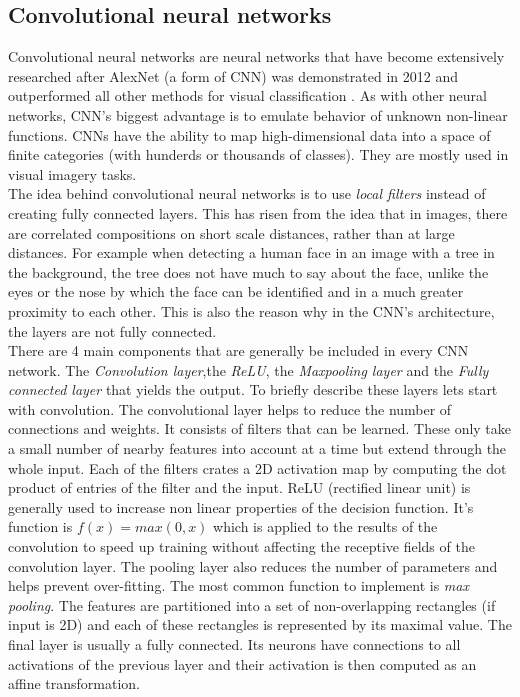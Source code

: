 \subsection{Convolutional neural networks}
Convolutional neural networks are neural networks that have become extensively researched after AlexNet (a form of CNN) was demonstrated in 2012 and outperformed all other methods for visual classification \cite{Krizhevsky:2012:ICD:2999134.2999257}. As with other neural networks, CNN's biggest advantage is to emulate behavior of unknown non-linear functions. CNNs have the ability to map high-dimensional data into a space of finite categories (with hunderds or thousands of classes). They are mostly used in visual imagery tasks. \\
The idea behind convolutional neural networks is to use \textit{local filters} instead of creating fully connected layers. This has risen from the idea that in images, there are correlated compositions on short scale distances, rather than at large distances. For example when detecting a human face in an image with a tree in the background, the tree does not have much to say about the face, unlike the eyes or the nose by which the face can be identified and in a much greater proximity to each other. This is also the reason why in the CNN's architecture, the layers are not fully connected. \\
There are 4 main components that are generally be included in every CNN network. The \textit{Convolution layer},the \textit{ReLU}, the \textit{Maxpooling layer} and the \textit{Fully connected layer} that yields the output. To briefly describe these layers lets start with convolution. The convolutional layer helps to reduce the number of connections and weights. It consists of filters that can be learned. These only take a small number of nearby features into account at a time but extend through the whole input. Each of the filters crates a 2D activation map by computing the dot product of entries of the filter and the input. ReLU (rectified linear unit) is generally used to increase non linear properties of the decision function. It's function is $ f(x) = max(0,x) $ which is applied to the results of the convolution to speed up training without affecting the receptive fields of the convolution layer. The pooling layer also reduces the number of parameters and helps prevent over-fitting. The most common function to implement is \textit{max pooling}. The features are partitioned into a set of non-overlapping rectangles (if input is 2D) and each of these rectangles  is represented by its maximal value. 
The final layer is usually a fully connected. Its neurons have connections to all activations of the previous layer and their activation is then computed as an affine transformation. 

